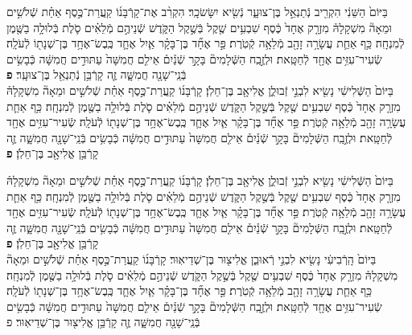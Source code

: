 \documentclass[twoside, openany, parskip=half, 11pt]{book}
\begin{document}
\begin{footnotesize}
\begin{multicols}{2}
בַּיּוֹם֙ הַשֵּׁנִ֔י הִקְרִ֖יב נְֿתַנְאֵ֣ל בֶּן־צוּעָ֑ר נְֿשִׂ֖יא יִשָּׂשׂכָֽר׃ הִקְרִ֨ב אֶת־קָרְֿבָּנ֜וֹ קַֽעֲרַת־כֶּ֣סֶף אַחַ֗ת שְֿׁלֹשִׁ֣ים וּמֵאָה֘ מִשְׁקָלָהּ֒ מִזְרָ֤ק אֶחָד֙ כֶּ֔סֶף שִׁבְעִ֥ים שֶׁ֖קֶל בְּֿשֶׁ֣קֶל הַקֹּ֑דֶשׁ שְֿׁנֵיהֶ֣ם מְֿלֵאִ֗ים סֹ֛לֶת בְּֿלוּלָ֥ה בַשֶּׁ֖מֶן לְֿמִנְחָֽה׃ כַּ֥ף אַחַ֛ת עֲשָׂרָ֥ה זָהָ֖ב מְֿלֵאָ֥ה קְֿטֹֽרֶת׃  פַּ֣ר אֶחָ֞ד בֶּן־בָּקָ֗ר אַ֧יִל אֶחָ֛ד כֶּֽבֶשׂ־אֶחָ֥ד בֶּן־שְׁנָת֖וֹ לְֿעֹלָֽה׃ שְֿׂעִיר־עִזִּ֥ים אֶחָ֖ד לְֿחַטָּֽאת׃ וּלְזֶ֣בַֽח הַשְּֿׁלָמִים֘ בָּקָ֣ר שְֿׁנַ֒יִם֒ אֵילִ֤ם חֲמִשָּׁה֙ עַתּוּדִ֣ים חֲמִשָּׁ֔ה כְּֿבָשִׂ֥ים בְּֿנֵֽי־שָׁנָ֖ה חֲמִשָּׁ֑ה זֶ֛ה קָרְֿבַּ֥ן נְֿתַנְאֵ֖ל בֶּן־צוּעָֽר׃ \textbf{פ} \\
בַּיּוֹם֙ הַשְּֿׁלִישִׁ֔י נָשִׂ֖יא לִבְנֵ֣י זְֿבוּלֻ֑ן אֱלִיאָ֖ב בֶּן־חֵלֹֽן׃ קָרְֿבָּנ֜וֹ קַֽעֲרַת־כֶּ֣סֶף אַחַ֗ת שְֿׁלֹשִׁ֣ים וּמֵאָה֘ מִשְׁקָלָהּ֒ מִזְרָ֤ק אֶחָד֙ כֶּ֔סֶף שִׁבְעִ֥ים שֶׁ֖קֶל בְּֿשֶׁ֣קֶל הַקֹּ֑דֶשׁ שְֿׁנֵיהֶ֣ם מְֿלֵאִ֗ים סֹ֛לֶת בְּֿלוּלָ֥ה בַשֶּׁ֖מֶן לְֿמִנְחָֽה׃ כַּ֥ף אַחַ֛ת עֲשָׂרָ֥ה זָהָ֖ב מְֿלֵאָ֥ה קְֿטֹֽרֶת׃ פַּ֣ר אֶחָ֞ד בֶּן־בָּקָ֗ר אַ֧יִל אֶחָ֛ד כֶּֽבֶשׂ־אֶחָ֥ד בֶּן־שְׁנָת֖וֹ לְֿעֹלָֽה׃ שְֿׂעִיר־עִזִּ֥ים אֶחָ֖ד לְֿחַטָּֽאת׃ וּלְזֶ֣בַֽח הַשְּֿׁלָמִים֘ בָּקָ֣ר שְֿׁנַ֒יִם֒ אֵילִ֤ם חֲמִשָּׁה֙ עַתּוּדִ֣ים חֲמִשָּׁ֔ה כְּֿבָשִׂ֥ים בְּֿנֵֽי־שָׁנָ֖ה חֲמִשָּׁ֑ה זֶ֛ה קָרְֿבַּ֥ן אֱלִיאָ֖ב בֶּן־חֵלֹֽן׃ \textbf{פ}


בַּיּוֹם֙ הַשְּֿׁלִישִׁ֔י נָשִׂ֖יא לִבְנֵ֣י זְֿבוּלֻ֑ן אֱלִיאָ֖ב בֶּן־חֵלֹֽן׃ קָרְֿבָּנ֜וֹ קַֽעֲרַת־כֶּ֣סֶף אַחַ֗ת שְֿׁלֹשִׁ֣ים וּמֵאָה֘ מִשְׁקָלָהּ֒ מִזְרָ֤ק אֶחָד֙ כֶּ֔סֶף שִׁבְעִ֥ים שֶׁ֖קֶל בְּֿשֶׁ֣קֶל הַקֹּ֑דֶשׁ שְֿׁנֵיהֶ֣ם מְֿלֵאִ֗ים סֹ֛לֶת בְּֿלוּלָ֥ה בַשֶּׁ֖מֶן לְֿמִנְחָֽה׃ כַּ֥ף אַחַ֛ת עֲשָׂרָ֥ה זָהָ֖ב מְֿלֵאָ֥ה קְֿטֹֽרֶת׃  פַּ֣ר אֶחָ֞ד בֶּן־בָּקָ֗ר אַ֧יִל אֶחָ֛ד כֶּֽבֶשׂ־אֶחָ֥ד בֶּן־שְׁנָת֖וֹ לְֿעֹלָֽה׃ שְֿׂעִיר־עִזִּ֥ים אֶחָ֖ד לְֿחַטָּֽאת׃ וּלְזֶ֣בַֽח הַשְּֿׁלָמִים֘ בָּקָ֣ר שְֿׁנַ֒יִם֒ אֵילִ֤ם חֲמִשָּׁה֙ עַתּוּדִ֣ים חֲמִשָּׁ֔ה כְּֿבָשִׂ֥ים בְּֿנֵֽי־שָׁנָ֖ה חֲמִשָּׁ֑ה זֶ֛ה קָרְֿבַּ֥ן אֱלִיאָ֖ב בֶּן־חֵלֹֽן׃ \textbf{פ} \\
 בַּיּוֹם֙ הָֽרְֿבִיעִ֔י נָשִׂ֖יא לִבְנֵ֣י רְֿאוּבֵ֑ן אֱלִיצ֖וּר בֶּן־שְׁדֵיאֽוּר׃ קָרְֿבָּנ֜וֹ קַֽעֲרַת־כֶּ֣סֶף אַחַ֗ת שְֿׁלֹשִׁ֣ים וּמֵאָה֘ מִשְׁקָלָהּ֒ מִזְרָ֤ק אֶחָד֙ כֶּ֔סֶף שִׁבְעִ֥ים שֶׁ֖קֶל בְּֿשֶׁ֣קֶל הַקֹּ֑דֶשׁ שְֿׁנֵיהֶ֣ם מְֿלֵאִ֗ים סֹ֛לֶת בְּֿלוּלָ֥ה בַשֶּׁ֖מֶן לְֿמִנְחָֽה׃ כַּ֥ף אַחַ֛ת עֲשָׂרָ֥ה זָהָ֖ב מְֿלֵאָ֥ה קְֿטֹֽרֶת׃ פַּ֣ר אֶחָ֞ד בֶּן־בָּקָ֗ר אַ֧יִל אֶחָ֛ד כֶּֽבֶשׂ־אֶחָ֥ד בֶּן־שְׁנָת֖וֹ לְֿעֹלָֽה׃ שְֿׂעִיר־עִזִּ֥ים אֶחָ֖ד לְֿחַטָּֽאת׃ וּלְזֶ֣בַֽח הַשְּֿׁלָמִים֘ בָּקָ֣ר שְֿׁנַ֒יִם֒ אֵילִ֤ם חֲמִשָּׁה֙ עַתּוּדִ֣ים חֲמִשָּׁ֔ה כְּֿבָשִׂ֥ים בְּֿנֵֽי־שָׁנָ֖ה חֲמִשָּׁ֑ה זֶ֛ה קָרְֿבַּ֥ן אֱלִיצ֖וּר בֶּן־שְׁדֵיאֽוּר׃ פ



\end{multicols}
\end{footnotesize}
\end{document}
